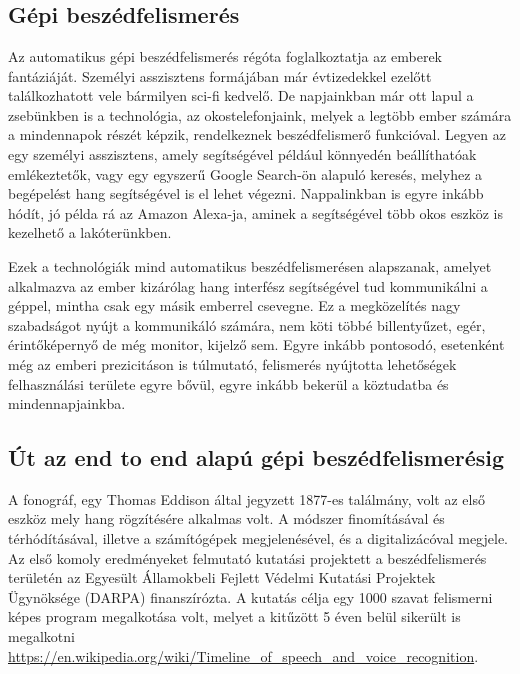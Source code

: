 \chapter{\bevezetes}

\section{Gépi beszédfelismerés}

Az automatikus gépi beszédfelismerés régóta foglalkoztatja az emberek fantáziáját. Személyi asszisztens formájában már évtizedekkel ezelőtt találkozhatott vele bármilyen sci-fi kedvelő. De napjainkban már ott lapul a zsebünkben is a technológia, az okostelefonjaink, melyek a legtöbb ember számára a mindennapok részét képzik, rendelkeznek beszédfelismerő funkcióval. Legyen az egy személyi asszisztens, amely segítségével például könnyedén beállíthatóak emlékeztetők, vagy egy egyszerű Google Search-ön alapuló keresés, melyhez a begépelést hang segítségével is el lehet végezni. Nappalinkban is egyre inkább hódít, jó példa rá az Amazon Alexa-ja, aminek a segítségével több okos eszköz is kezelhető a lakóterünkben.

Ezek a technológiák mind automatikus beszédfelismerésen alapszanak, amelyet alkalmazva az ember kizárólag hang interfész segítségével tud kommunikálni a géppel, mintha csak egy másik emberrel csevegne. Ez a megközelítés nagy szabadságot nyújt a kommunikáló számára, nem köti többé billentyűzet, egér, érintőképernyő de még monitor, kijelző sem. Egyre inkább pontosodó, esetenként még az emberi prezicitáson is túlmutató, felismerés nyújtotta lehetőségek felhasználási területe egyre bővül, egyre inkább bekerül a köztudatba és mindennapjainkba.

\section{Út az end to end alapú gépi beszédfelismerésig}

A fonográf, egy Thomas Eddison által jegyzett 1877-es találmány, volt az első eszköz mely hang rögzítésére alkalmas volt. A módszer finomításával és térhódításával,  illetve a számítógépek megjelenésével, és a digitalizácóval megjele. Az első komoly eredményeket felmutató kutatási projektett a beszédfelismerés területén az Egyesült Államokbeli Fejlett Védelmi Kutatási Projektek Ügynöksége (DARPA) finanszírózta. A kutatás célja egy 1000 szavat felismerni képes program megalkotása volt, melyet a kitűzött 5 éven belül sikerült is megalkotni \url{https://en.wikipedia.org/wiki/Timeline_of_speech_and_voice_recognition}.


